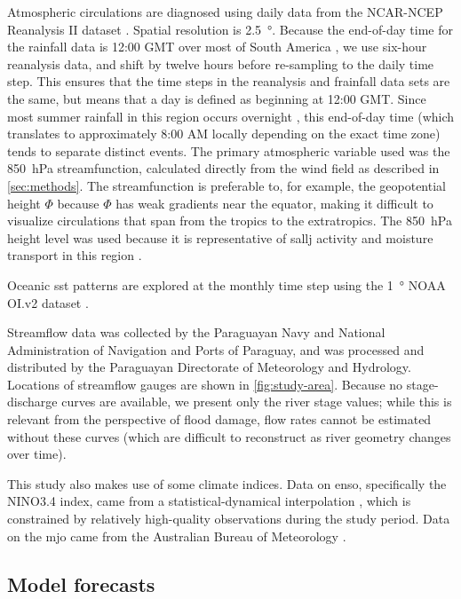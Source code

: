 \documentclass[twocol]{ametsoc}
\begin{document}
Atmospheric circulations are diagnosed using daily data from the NCAR-NCEP Reanalysis II dataset \citep{Kanamitsu2002}.
Spatial resolution is \SI{2.5}{\degree}.
Because the end-of-day time for the rainfall data is 12:00 GMT over most of South America \citep{Chen2008}, we use six-hour reanalysis data, and shift by twelve hours before re-sampling to the daily time step.
This ensures that the time steps in the reanalysis and ƒrainfall data sets are the same, but means that a day is defined as beginning at 12:00 GMT.
Since most summer rainfall in this region occurs overnight \citep{Vera2006,Salio2007}, this end-of-day time (which translates to approximately 8:00 AM locally depending on the exact time zone) tends to separate distinct events.
The primary atmospheric variable  used was the \SI{850}{\hecto\pascal} streamfunction, calculated directly from the wind field as described in \cref{sec:methods}.
The streamfunction is preferable to, for example, the geopotential height $\Phi$ because $\Phi$ has weak gradients near the equator, making it difficult to visualize circulations that span from the tropics to the extratropics.
The \SI{850}{\hecto\pascal} height level was used because it is representative of \gls{sallj} activity and moisture transport in this region \citep{Marengo2004,Salio2007}.

Oceanic \gls{sst} patterns are explored at the monthly time step using the \SI{1}{\degree} NOAA OI.v2 dataset \citep{Reynolds2002}.

Streamflow data was collected by the Paraguayan Navy and National Administration of Navigation and Ports of Paraguay, and was processed and distributed by the Paraguayan Directorate of Meteorology and Hydrology.
Locations of streamflow gauges are shown in \cref{fig:study-area}.
Because no stage-discharge curves are available, we present only the river stage values; while this is relevant from the perspective of flood damage, flow rates cannot be estimated without these curves (which are difficult to reconstruct as river geometry changes over time).

This study also makes use of some climate indices.
Data on \gls{enso}, specifically the NINO3.4 index, came from a statistical-dynamical interpolation \citep{Kaplan1998}, which is constrained by relatively high-quality observations during the study period.
Data on the \gls{mjo}   came from the Australian Bureau of Meteorology \citep{Wheeler2004}.

\subsection{Model forecasts}
\end{document}

